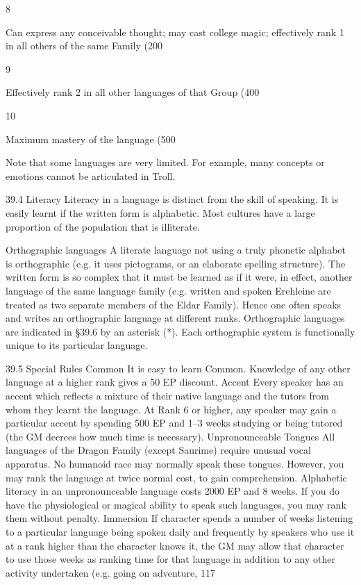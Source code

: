 \documentclass[a4paper]{article}
\begin{document}
\begin{multicols}{3}
8

Can express any conceivable thought;
may cast college magic; effectively rank 1
in all others of the same Family (200%

9

Effectively rank 2 in all other languages
of that Group (400%

10

Maximum mastery of the language
(500%

Note that some languages are very limited. For
example, many concepts or emotions cannot be
articulated in Troll.

39.4 Literacy
Literacy in a language is distinct from the skill of
speaking. It is easily learnt if the written form is
alphabetic. Most cultures have a large proportion
of the population that is illiterate.

Orthographic languages
A literate language not using a truly phonetic alphabet is orthographic (e.g. it uses pictograms, or
an elaborate spelling structure). The written form is
so complex that it must be learned as if it were, in
effect, another language of the same language
family (e.g. written and spoken Erehleine are
treated as two separate members of the Eldar Family). Hence one often speaks and writes an orthographic language at different ranks. Orthographic
languages are indicated in §39.6 by an asterisk (*).
Each orthographic system is functionally unique to
its particular language.

39.5 Special Rules
Common It is easy to learn Common. Knowledge
of any other language at a higher rank gives a 50%
EP discount.
Accent Every speaker has an accent which reflects
a mixture of their native language and the tutors
from whom they learnt the language. At Rank 6 or
higher, any speaker may gain a particular accent by
spending 500 EP and 1–3 weeks studying or being
tutored (the GM decrees how much time is necessary).
Unpronounceable Tongues All languages of the
Dragon Family (except Saurime) require unusual
vocal apparatus. No humanoid race may normally
speak these tongues. However, you may rank the
language at twice normal cost, to gain comprehension. Alphabetic literacy in an unpronounceable
language costs 2000 EP and 8 weeks. If you do
have the physiological or magical ability to speak
such languages, you may rank them without penalty.
Immersion If character spends a number of weeks
listening to a particular language being spoken
daily and frequently by speakers who use it at a
rank higher than the character knows it, the GM
may allow that character to use those weeks as
ranking time for that language in addition to any
other activity undertaken (e.g. going on adventure,
117


\end{multicols}
\end{document}
